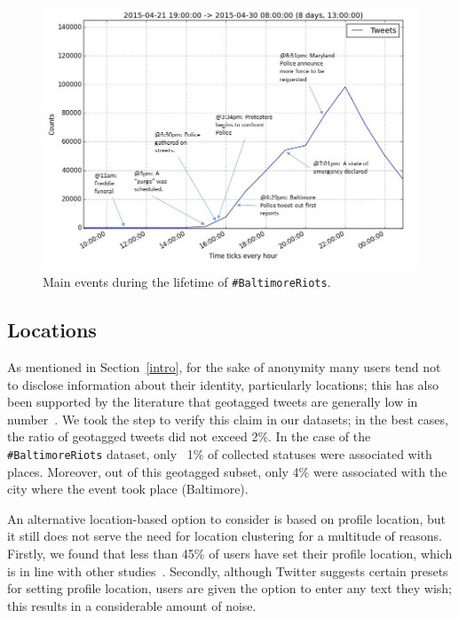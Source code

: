 \begin{figure}[htb]
\centering
\includegraphics[width=\columnwidth]{images/mainevents.png}
\caption{Main events during the lifetime of {\texttt{\#BaltimoreRiots}}.}
\label{fig:mainevents}
\end{figure}

\subsection{Locations}\label{baltimorelocations}

As mentioned in Section~\ref{intro}, for the sake of anonymity many
users tend not to disclose information about their identity,
particularly locations; this has also been supported by the literature
that geotagged tweets are generally low in
number~\cite{kang-et-al:2013}. We took the step to verify this claim
in our datasets; in the best cases, the ratio of geotagged tweets did
not exceed 2\%. In the case of the {\texttt{\#BaltimoreRiots}}
dataset, only ~1\% of collected statuses were associated with
places. Moreover, out of this geotagged subset, only 4\% were
associated with the city where the event took place (Baltimore).

An alternative location-based option to consider is based on profile
location, but it still does not serve the need for location clustering
for a multitude of reasons. Firstly, we found that less than 45\% of
users have set their profile location, which is in line with other
studies~\cite{graham-et-al:2014}. Secondly, although Twitter suggests
certain presets for setting profile location, users are given the
option to enter any text they wish; this results in a considerable
amount of noise.


